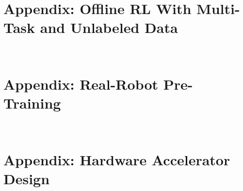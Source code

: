 \documentclass[letterpaper,12pt, oneside]{lib/ucthesis}
\def\ssp{\def\baselinestretch{1.0}\large\normalsize}
\begin{document}
\begin{dissertationText}
\chapter{Appendix: Offline RL With Multi-Task and Unlabeled Data}~\label{sec:appendix-cds-uds}


\chapter{Appendix: Real-Robot Pre-Training}~\label{sec:appendix-ptr}


\chapter{Appendix: Hardware Accelerator Design}~\label{sec:appendix-prime}


\ssp

% 



\end{dissertationText}
\end{document}

